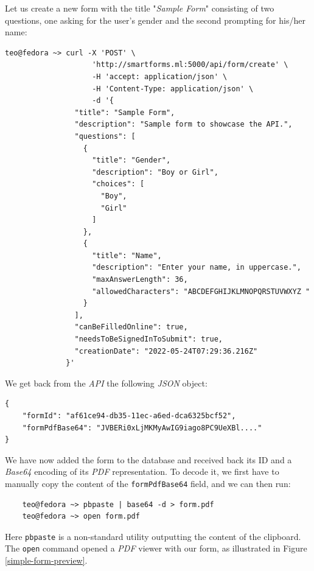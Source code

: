 \documentclass[11pt, a4paper]{report}
\def\code#1{\texttt{#1}}
\begin{document}
Let us create a new form with the title "\textit{Sample Form}" consisting of two questions, one asking for the user's gender and the second prompting for his/her name:

\begin{verbatim}
teo@fedora ~> curl -X 'POST' \
                    'http://smartforms.ml:5000/api/form/create' \
                    -H 'accept: application/json' \
                    -H 'Content-Type: application/json' \
                    -d '{
                "title": "Sample Form",
                "description": "Sample form to showcase the API.",
                "questions": [
                  {
                    "title": "Gender",
                    "description": "Boy or Girl",
                    "choices": [
                      "Boy",
                      "Girl"
                    ]
                  },
                  {
                    "title": "Name",
                    "description": "Enter your name, in uppercase.",
                    "maxAnswerLength": 36,
                    "allowedCharacters": "ABCDEFGHIJKLMNOPQRSTUVWXYZ "
                  }
                ],
                "canBeFilledOnline": true,
                "needsToBeSignedInToSubmit": true,
                "creationDate": "2022-05-24T07:29:36.216Z"
              }'
\end{verbatim}

We get back from the \textit{API} the following \textit{JSON} object:
\begin{verbatim}
{
    "formId": "af61ce94-db35-11ec-a6ed-dca6325bcf52",
    "formPdfBase64": "JVBERi0xLjMKMyAwIG9iago8PC9UeXBl...."
}
\end{verbatim}

We have now added the form to the database and received back its ID and a \textit{Base64} encoding of its \textit{PDF} representation. To decode it, we first have to manually copy the content of the \code{formPdfBase64} field, and we can then run:

\begin{verbatim}
    teo@fedora ~> pbpaste | base64 -d > form.pdf
    teo@fedora ~> open form.pdf
\end{verbatim}

Here \code{pbpaste} is a non-standard utility outputting the content of the clipboard. The \code{open} command opened a \textit{PDF} viewer with our form, as illustrated in Figure \ref{simple-form-preview}.
\end{document}
